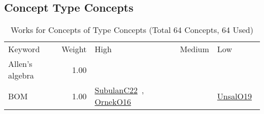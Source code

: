 \subsection{Concept Type Concepts}
\label{sec:Concepts}
\label{Concepts}
{\scriptsize
\begin{longtable}{p{3cm}r>{\raggedright\arraybackslash}p{6cm}>{\raggedright\arraybackslash}p{6cm}>{\raggedright\arraybackslash}p{8cm}}
\rowcolor{white}\caption{Works for Concepts of Type Concepts (Total 64 Concepts, 64 Used)}\\ \toprule
\rowcolor{white}Keyword & Weight & High & Medium & Low\\ \midrule\endhead
\bottomrule
\endfoot
\index{Allen's algebra}\index{Concepts!Allen's algebra}Allen's algebra &  1.00 &  &  & \\
\index{BOM}\index{Concepts!BOM}BOM &  1.00 & \href{../works/SubulanC22.pdf}{SubulanC22}~\cite{SubulanC22}, \href{../works/OrnekO16.pdf}{OrnekO16}~\cite{OrnekO16} &  & \href{../works/UnsalO19.pdf}{UnsalO19}~\cite{UnsalO19}\\

\end{longtable}}
